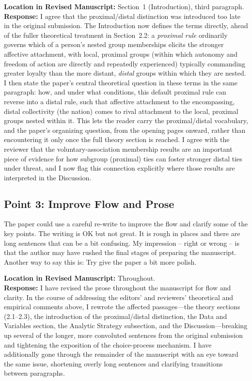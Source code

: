 \documentclass[11pt]{article}
\begin{document}
\noindent\textbf{Location in Revised Manuscript:} Section~1 (Introduction), third paragraph.\\[4pt]
\textbf{Response:} I agree that the proximal/distal distinction was introduced too late in the original submission. The Introduction now defines the terms directly, ahead of the fuller theoretical treatment in Section~2.2: a \textit{proximal rule} ordinarily governs which of a person's nested group memberships elicits the stronger affective attachment, with local, proximal groups (within which autonomy and freedom of action are directly and repeatedly experienced) typically commanding greater loyalty than the more distant, \textit{distal} groups within which they are nested. I then state the paper's central theoretical question in these terms in the same paragraph: how, and under what conditions, this default proximal rule can reverse into a distal rule, such that affective attachment to the encompassing, distal collectivity (the nation) comes to rival attachment to the local, proximal groups nested within it. This lets the reader carry the proximal/distal vocabulary, and the paper's organizing question, from the opening pages onward, rather than encountering it only once the full theory section is reached. I agree with the reviewer that the voluntary-association membership results are an important piece of evidence for how subgroup (proximal) ties can foster stronger distal ties under threat, and I now flag this connection explicitly where those results are interpreted in the Discussion.

\subsection*{Point 3: Improve Flow and Prose}

\begin{reviewercomment}
The paper could use a careful re-write to improve the flow and clarify some of the key points. The writing is OK but not great. It is rough in places and there are long sentences that can be a bit confusing. My impression -- right or wrong -- is that the author may have rushed the final stages of preparing the manuscript. Another way to say this is: Try give the paper a bit more polish.
\end{reviewercomment}

\noindent\textbf{Location in Revised Manuscript:} Throughout.\\[4pt]
\textbf{Response:} I have revised the prose throughout the manuscript for flow and clarity. In the course of addressing the editors' and reviewers' theoretical and empirical comments above, I rewrote the affected passages---the theory sections (2.1--2.3), the introduction of the proximal/distal distinction, the Data and Variables section, the Analytic Strategy subsection, and the Discussion---breaking up several of the longer, more convoluted sentences from the original submission and tightening the exposition of the choice-process mechanism. I have additionally gone through the remainder of the manuscript with an eye toward the same issue, shortening overly long sentences and clarifying transitions between paragraphs.
\end{document}

